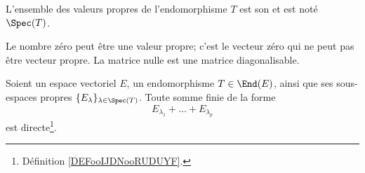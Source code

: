 \begin{definition}
    L'ensemble des valeurs propres de l'endomorphisme \( T\) est son  et est noté \( \Spec(T)\).
\end{definition}

\begin{remark}
    Le nombre zéro peut être une valeur propre; c'est le vecteur zéro qui ne peut pas être vecteur propre. La matrice nulle est une matrice diagonalisable.
\end{remark}

\begin{lemma}       \label{LemjcztYH}
    Soient un espace vectoriel \( E\), un endomorphisme \( T\in \End(E)\), ainsi que ses sous-espaces propres \( \{ E_{\lambda} \}_{\lambda\in \Spec(T)}  \). Toute somme finie de la forme
    \begin{equation}
        E_{\lambda_1}+\ldots+E_{\lambda_p}
    \end{equation}
    est directe\footnote{Définition \ref{DEFooIJDNooRUDUYF}.}.
\end{lemma}

